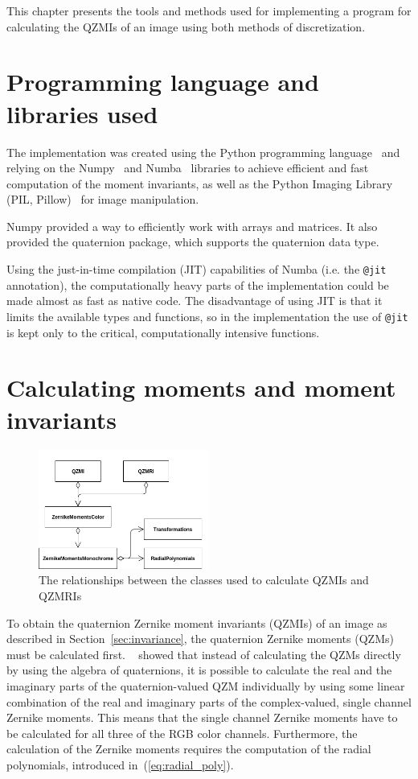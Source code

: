This chapter presents the tools and methods used for implementing a program for calculating the QZMIs of an image using both methods of discretization.

\section{Programming language and libraries used}
The implementation was created using the Python programming language~\cite{python} and relying on the Numpy~\cite{numpy} and Numba~\cite{numba} libraries to achieve efficient and fast computation of the moment invariants, as well as the Python Imaging Library (PIL, Pillow)~\cite{pil} for image manipulation.

Numpy provided a way to efficiently work with arrays and matrices. It also provided the quaternion package, which supports the quaternion data type.

Using the just-in-time compilation (JIT) capabilities of Numba (i.e. the \texttt{@jit} annotation), the computationally heavy parts of the implementation could be made almost as fast as native code. The disadvantage of using JIT is that it limits the available types and functions, so in the implementation the use of \texttt{@jit} is kept only to the critical, computationally intensive functions. 

\section{Calculating moments and moment invariants}
\begin{figure}[tbp]
    \centering
        \includegraphics[width=0.5\textwidth]{figures/qzmi_classes.png}
    \caption{The relationships between the classes used to calculate QZMIs and QZMRIs}
    \label{fig:classes}
\end{figure}
To obtain the quaternion Zernike moment invariants (QZMIs) of an image as described in Section~\ref{sec:invariance}, the quaternion Zernike moments (QZMs) must be calculated first. \citeauthor{qzmi}~\cite{qzmi} showed that instead of calculating the QZMs directly by using the algebra of quaternions, it is possible to calculate the real and the imaginary parts of the quaternion-valued QZM individually by using some linear combination of the real and imaginary parts of the complex-valued, single channel Zernike moments. This means that the single channel Zernike moments have to be calculated for all three of the RGB color channels.
Furthermore, the calculation of the Zernike moments requires the computation of the radial polynomials, introduced in~(\ref{eq:radial_poly}).

